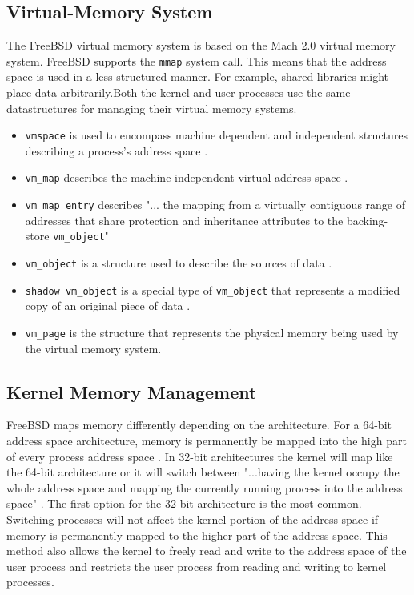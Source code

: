 \subsection{Virtual-Memory System}
The FreeBSD virtual memory system is based on the Mach 2.0 virtual memory system\cite{Freebsdtext}. FreeBSD supports the \lstinline{mmap} system call. This means that the address space is used in a less structured manner. For example, shared libraries might place data arbitrarily.Both the kernel and user processes use the same datastructures for managing their virtual memory systems.
\begin{itemize}
    \item \lstinline{vmspace} is used to encompass machine dependent and independent structures describing a process's address space \cite{Freebsdtext}.
    \item \lstinline{vm_map} describes the machine independent virtual address space \cite{Freebsdtext}.
    \item \lstinline{vm_map_entry} describes "... the mapping from a virtually contiguous range of addresses that share protection and inheritance attributes to the backing-store \lstinline{vm_object}"\cite{Freebsdtext}
    \item \lstinline{vm_object} is a structure used to describe the sources of data \cite{Freebsdtext}.
    \item \lstinline{shadow vm_object} is a special type of \lstinline{vm_object} that represents a modified copy of an original piece of data \cite{Freebsdtext}.
    \item \lstinline{vm_page} is the structure that represents the physical memory being used by the virtual memory system.
\end{itemize}

\subsection{Kernel Memory Management}
FreeBSD maps memory differently depending on the architecture. For a 64-bit address space architecture, memory is permanently be mapped into the high part of every process address space \cite{Freebsdtext}. In 32-bit architectures the kernel will map like the 64-bit architecture or it will switch between "...having the kernel occupy the whole address space and mapping the currently running process into the address space" \cite{Freebsdtext}. The first option for the 32-bit architecture is the most common. Switching processes will not affect the kernel portion of the address space if memory is permanently mapped to the higher part of the address space\cite{Freebsdtext}. This method also allows the kernel to freely read and write to the address space of the user process and restricts the user process from reading and writing to kernel processes\cite{Freebsdtext}.

